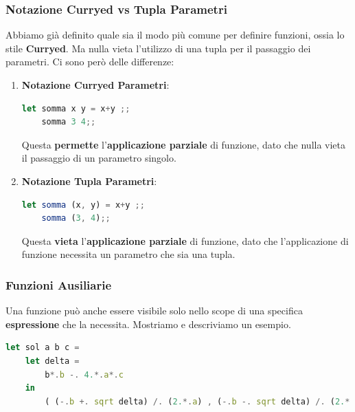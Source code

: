 \documentclass{article}
\begin{document}
\newpage

\subsubsection{Notazione Curryed vs Tupla Parametri}

Abbiamo già definito quale sia il modo più comune per definire funzioni, ossia lo stile \textbf{Curryed}. Ma nulla vieta l'utilizzo di una tupla per il passaggio dei parametri. Ci sono però delle differenze:

\begin{enumerate}
    \item \textbf{Notazione Curryed Parametri}: 
    \vspace*{10px}
    \begin{lstlisting}[language = JavaScript]
    let somma x y = x+y ;;
    somma 3 4;;
    \end{lstlisting}
    \vspace*{-15px}
    Questa \textbf{permette} l'\textbf{applicazione parziale} di funzione, dato che nulla vieta il passaggio di un parametro singolo.

    \item \textbf{Notazione Tupla Parametri}: 
    \vspace*{10px}
    \begin{lstlisting}[language = JavaScript]
    let somma (x, y) = x+y ;;
    somma (3, 4);;
    \end{lstlisting}
    \vspace*{-15px}
    Questa \textbf{vieta} l'\textbf{applicazione parziale} di funzione, dato che l'applicazione di funzione necessita un parametro che sia una tupla.
    
\end{enumerate}

\vspace*{20px}

\subsubsection{Funzioni Ausiliarie}

Una funzione può anche essere visibile solo nello scope di una specifica \textbf{espressione} che la necessita. Mostriamo e descriviamo un esempio.

\vspace*{10px}
    \begin{lstlisting}[language = JavaScript]
    let sol a b c =
    let delta =
        b*.b -. 4.*.a*.c
    in
        ( (-.b +. sqrt delta) /. (2.*.a) , (-.b -. sqrt delta) /. (2.*.a) ) ;; 
    \end{lstlisting}
\vspace*{-10px}
\end{document}
